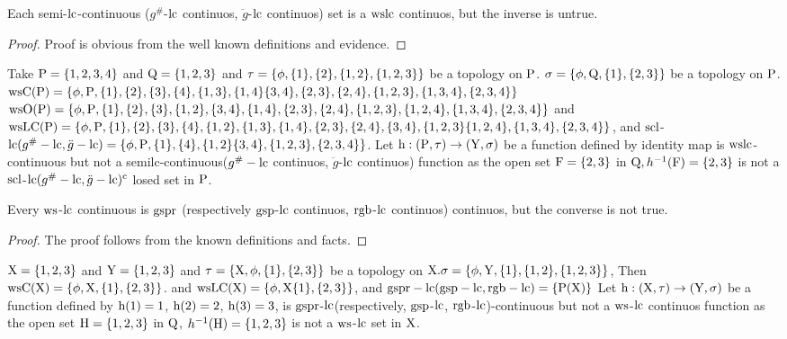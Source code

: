 \begin{thm}\label{thm7.3.3}
Each semi-$\mathrm{lc}$-continuous ($g^{\text{\#}}$-$\mathrm{lc}$ continuos, $\ddot{g}$-$\mathrm{lc}$ continuos) set is a $\mathrm{ws}\mathrm{lc}$ continuos, but the inverse is untrue.
\end{thm}

\begin{proof}
Proof is obvious from the well known definitions and evidence.
\end{proof}

\begin{exm}\label{exam7.3.4}
Take $\mathrm{P} = \{1,2,3,4\}$ and $\mathrm{Q}= \{1,2,3\}$ and $\tau = \{\phi, \{1\},\{2\}, \{1,2\},\break \{1,2,3\}\}$ be a topology on $\mathrm{P}$. $\sigma = \{\phi, \mathrm{Q}, \{1\},\{ 2, 3\}\}$ be a topology on $\mathrm{P}$. $\mathrm{ws}\mathrm{C}(\mathrm{P}) = \{\phi, \mathrm{P},\{1\}, \{2\}, \{3\}, \{4\},\{1,3\}, \{1, 4\} \{3,4\}, \{2,3\}, \{2,4\}, \{1,2, 3\},\{1,3,4\},\{2,3,4\}\}$\break $\ws\TSO(\TSP) = \{\phi, \TSP, \{1\}, \{2\}, \{3\},\{1,2\},\{3,4\}, \{1,4\}, \{2,3\}, \{2,4\}, \{1,2,3\}, \{1,2,4\},\break \{1,3,4\},\{2,3,4\}\}$ and $\ws\LC(\TSP)= \{\phi, \TSP ,\{1\}, \{2\},\{3\},\{4\},\{1,2\},\{1,3\}, \{1,4\},\break \{2,3\}, \{2,4\},\{3,4\}, \{1,2,3\}\{1,2,4\},\{1,3,4\},\{2,3,4\}\}$, and $\mathrm{scl}$-$\mathrm{lc}(g^{\text{\#}}-\mathrm{lc}, \ddot{g}-\mathrm{lc}) = \{\phi, \mathrm{P},\{1\},\{4\},\{1,2\}\{3, 4\},\{1,2,3\},\{2,3,4\}\}$. Let $\mathrm{h}: (\mathrm{P}, \tau )\to(\mathrm{Y}, \sigma)$ be a function defined by identity map is $\mathrm{ws}\mathrm{lc}$-continuous but not a semilc-continuous($g^{\text{\#}} -\mathrm{lc}$ continuos, $\ddot{g}$-$\mathrm{lc}$ continuos) function as the open set $\mathrm{F}=\{2,3\}$ in $\mathrm{Q}, h^{-1} (\mathrm{F})=\{2,3\}$ is not a $\mathrm{scl}$-$\mathrm{lc}(g^{\text{\#}} -\mathrm{lc}, \ddot{g} -\mathrm{lc})^{\text{c}}$ losed set in $\mathrm{P}$.
\end{exm}

\begin{thm}\label{thm7.3.4}
Every $\mathrm{ws}$-$\mathrm{lc}$ continuous is $\mathrm{gspr}$ (respectively $\mathrm{gsp}$-$\mathrm{lc}$ continuos, $\mathrm{rgb}$-$\mathrm{lc}$ continuos) continuos, but the converse is not true.
\end{thm}

\begin{proof}
The proof follows from the known definitions and facts.
\end{proof}

\begin{exm}\label{exam7.3.5}
$\mathrm{X} = \{1, 2, 3\}$ and $\mathrm{Y}= \{1, 2, 3\}$ and $\tau = \{\mathrm{X}, \phi, \{1\}, \{2, 3\}\}$ be a topology on $\mathrm{X}. \sigma = \{\phi, \mathrm{Y}, \{1\}, \{1, 2\}, \{1, 2, 3\}\}$, Then $\mathrm{ws}\mathrm{C}(\mathrm{X}) = \{\phi, \mathrm{X}, \{1\}, \{2, 3\}\}$. and $\mathrm{ws}\mathrm{LC}(\mathrm{X})= \{\phi, \mathrm{X} \{1\}, \{2, 3\}\}$, and $\mathrm{gspr} - \mathrm{lc}(\mathrm{gsp}-\mathrm{lc}, \mathrm{rgb}-\mathrm{lc}) = \{\mathrm{P}(\mathrm{X})\}$ Let $\mathrm{h}: (\mathrm{X}, \tau)\to(\mathrm{Y}, \sigma)$ be a function defined by $\mathrm{h}(1)= 1$, $\mathrm{h}(2)=2$, $\mathrm{h}(3)=3$, is $\mathrm{gspr}$-$\mathrm{lc}$(respectively, $\mathrm{gsp}$-$\mathrm{lc}$, $\mathrm{rgb}$-$\mathrm{lc}$)-continuous but not a $\mathrm{ws}$-$\mathrm{lc}$ continuos function as the open set $\mathrm{H}=\{1,2,3\}$ in $\mathrm{Q}$, $h^{-1}(\mathrm{H})=\{1,2,3\}$ is not a $\mathrm{ws}$-$\mathrm{lc}$ set in $\mathrm{X}$.
\end{exm}

